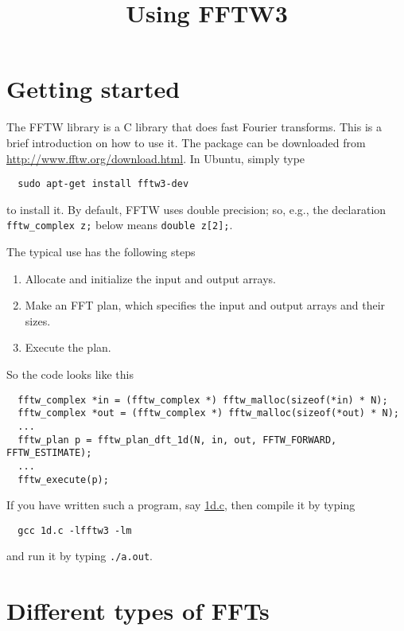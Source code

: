 \documentclass[12pt]{article}
\begin{document}
\title{Using FFTW3}
\date{}
\maketitle

\tableofcontents


\section{Getting started}

The FFTW library is a C library that does fast Fourier transforms.
%
This is a brief introduction on how to use it.
%
The package can be downloaded from \url{http://www.fftw.org/download.html}.
%
In Ubuntu, simply type
\begin{verbatim}
  sudo apt-get install fftw3-dev
\end{verbatim}
to install it.
%
By default, FFTW uses double precision;
so, e.g., the declaration
\texttt{fftw\_complex z;} below means \texttt{double z[2];}.



The typical use has the following steps
%
\begin{enumerate}
  \item Allocate and initialize the input and output arrays.
  \item Make an FFT plan, which specifies the input and output arrays and their sizes.
  \item Execute the plan.
\end{enumerate}

So the code looks like this
{\footnotesize
\begin{verbatim}
  fftw_complex *in = (fftw_complex *) fftw_malloc(sizeof(*in) * N);
  fftw_complex *out = (fftw_complex *) fftw_malloc(sizeof(*out) * N);
  ...
  fftw_plan p = fftw_plan_dft_1d(N, in, out, FFTW_FORWARD, FFTW_ESTIMATE);
  ...
  fftw_execute(p);
\end{verbatim}
}

If you have written such a program, say \url{1d.c},
then compile it by typing
\begin{verbatim}
  gcc 1d.c -lfftw3 -lm
\end{verbatim}
and run it by typing \texttt{./a.out}.



\section{Different types of FFTs}
\end{document}
